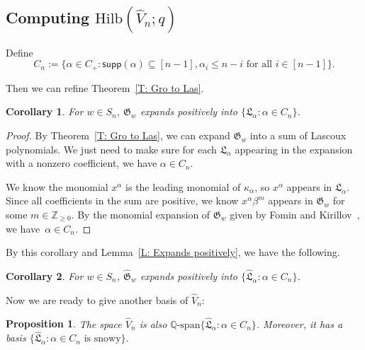 \documentclass[10pt]{amsart}
\theoremstyle{plain}
\newtheorem{cor}[cor]{Corollary}
\theoremstyle{plain}
\theoremstyle{definition}
\theoremstyle{definition}
\theoremstyle{definition}
\theoremstyle{plain}
\theoremstyle{plain}
\theoremstyle{plain}
\theoremstyle{plain}
\newtheorem{prop}[prop]{Proposition}
\theoremstyle{plain}
\theoremstyle{remark}
\theoremstyle{remark}
\theoremstyle{plain}
\theoremstyle{plain}
\newcommand{\fG}{\mathfrak{G}}
\newcommand{\fGb}{\fG}
\newcommand{\fL}{\mathfrak{L}}
\newcommand{\fLb}{\fL}
\newcommand{\topLas}{\widehat{\fL}}
\newcommand{\topGro}{\widehat{\fG}}
\newcommand{\supp}{\mathsf{supp}}
\newcommand{\Q}{\mathbb{Q}}
\newcommand{\Hilb}{\mathrm{Hilb}}
\begin{document}
\subsection{Computing \texorpdfstring{$\Hilb(\widehat{V}_n; q)$}{TEXT}}
\label{subsec.hilbert.vn}

Define 
$$C_n := \{ \alpha \in C_+: \supp(\alpha) \subseteq [n - 1], \alpha_i \leq n - i \textrm{ for all $i \in [n - 1]$}\}.$$

Then we can refine 
Theorem~\ref{T: Gro to Las}.
\begin{cor}
\label{C: Gro to Las for n}
For $w \in S_n$, 
$\fGb_w$ expands positively into $\{\fLb_\alpha: \alpha \in C_n\}$.
\end{cor}
\begin{proof}
By Theorem~\ref{T: Gro to Las},
we can expand $\fGb_w$ into a sum of Lascoux polynomials.
We just need to make sure for each $\fLb_{\alpha}$ appearing
in the expansion with a nonzero coefficient,
we have $\alpha \in C_n$.

We know the monomial $x^\alpha$ is the leading monomial of 
$\kappa_\alpha$, so $x^\alpha$ appears in $\fLb_\alpha$.
Since all coefficients in the sum are positive,
we know $x^\alpha \beta^m$ appears in $\fGb_w$ for
some $m \in \mathbb{Z}_{\geq 0}$.
By the monomial expansion of $\fGb_w$ 
given by Fomin and Kirillov~\cite{FK},
we have~$\alpha \in C_n$.
\end{proof}

By this corollary and Lemma~\ref{L: Expands positively},
we have the following. 
\begin{cor}
\label{C: Top Gro to Top Las for n}
For $w \in S_n$, 
$\topGro_w$ expands positively 
into $\{\topLas_\alpha: \alpha \in C_n\}$.
\end{cor}

Now we are ready to give another basis of $\widehat{V}_n$:
\begin{prop}
\label{P: Top Las basis}
The space $\widehat{V}_n$ is also $\Q\textrm{-span}\{\topLas_\alpha: \alpha \in C_n\}$. 
Moreover, it has a basis 
$\{ \topLas_\alpha: \alpha \in C_n \textrm{ is snowy}\}$.
\end{prop}
\end{document}
